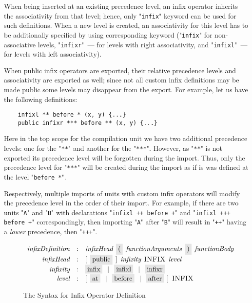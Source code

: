 When being inserted at an existing precedence level, an infix operator inherits the associativity from that level; hence, only "\lstinline|infix|"
keyword can be used for such definitions. When a new level is created, an associativity for this level has to be additionally specified
by using corresponding keyword ("\lstinline|infix|" for non-associative levels, "\lstinline|infixr|"~--- for levels with right
associativity, and "\lstinline|infixl|"~--- for levels with left associativity).

When public infix operators are exported, their relative precedence levels and associativity are exported as well; since not all 
custom infix definitions may be made public some levels may disappear from the export. For example, let us have the following definitions:

\begin{lstlisting}
    infixl ** before * (x, y) {...}
    public infixr *** before ** (x, y) {...}
\end{lstlisting}

Here in the top scope for the compilation unit we have two additional precedence levels: one for the "\lstinline|**|" and another for the "\lstinline|***|".
However, as  "\lstinline|**|" is not exported its precedence level will be forgotten during the import. Thus, only the precedence level for
"\lstinline|***|" will be created during the import as if is was defined at the level  "\lstinline|before *|".

Respectively, multiple imports of units with custom infix operators will modify the precedence level in the order of their import. For example,
if there are two units  "\lstinline|A|" and  "\lstinline|B|" with declarations "\lstinline|infixl ++ before +|" and "\lstinline|infixl +++ before +|"
correspondingly, then importing  "\lstinline|A|" after  "\lstinline|B|" will result in "\lstinline|++|" having a \emph{lower} precedence, then
"\lstinline|+++|".

\begin{figure}[t]
  \[
    \begin{array}{rcl}
      \defterm{infixDefinition} & : & \nonterm{infixHead}\s\term{(}\s\nonterm{functionArguments}\s\term{)}\s\nonterm{functionBody}\\
      \defterm{infixHead}       & : & [\s\term{public}\s]\s\nonterm{infixity}\s\token{INFIX}\s\nonterm{level}\\
      \defterm{infixity}        & : & \term{infix}\alt\term{infixl}\alt\term{infixr}\\
      \defterm{level}           & : & [\s\term{at}\alt\term{before}\alt\term{after}\s]\s\token{INFIX}
    \end{array}
  \]
  \caption{The Syntax for Infix Operator Definition}
  \label{custom_infix_construct}
\end{figure}

